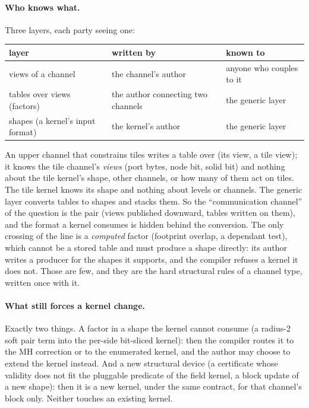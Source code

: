 \documentclass[11pt]{article}
\newcommand{\1}{\mathds{1}}
\begin{document}
\paragraph{Who knows what.} Three layers, each party seeing one:
\begin{center}
\small
\begin{tabular}{@{}lll@{}}
\toprule
layer & written by & known to \\
\midrule
views of a channel & the channel's author & anyone who couples to it \\
tables over views (factors) & the author connecting two channels & the generic layer \\
shapes (a kernel's input format) & the kernel's author & the generic layer \\
\bottomrule
\end{tabular}
\end{center}
An upper channel that constrains tiles writes a table over (its view, a tile
view); it knows the tile channel's \emph{views} (port bytes, node bit, solid
bit) and nothing about the tile kernel's shape, other channels, or how many
of them act on tiles. The tile kernel knows its shape and nothing about
levels or channels. The generic layer converts tables to shapes and stacks
them. So the ``communication channel'' of the question is the pair
(views published downward, tables written on them), and the format a kernel
consumes is hidden behind the conversion. The only crossing of the line is a
\emph{computed} factor (footprint overlap, a dependant test), which cannot be a
stored table and must produce a shape directly: its author writes a producer
for the shapes it supports, and the compiler refuses a kernel it does not.
Those are few, and they are the hard structural rules of a channel type,
written once with it.

\paragraph{What still forces a kernel change.} Exactly two things. A factor in
a shape the kernel cannot consume (a radius-2 soft pair term into the
per-side bit-sliced kernel): then the compiler routes it to the MH correction
or to the enumerated kernel, and the author may choose to extend the kernel
instead. And a new structural device (a certificate whose validity does not
fit the pluggable predicate of the field kernel, a block update of a new
shape): then it is a new kernel, under the same contract, for that channel's
block only. Neither touches an existing kernel.
\end{document}
